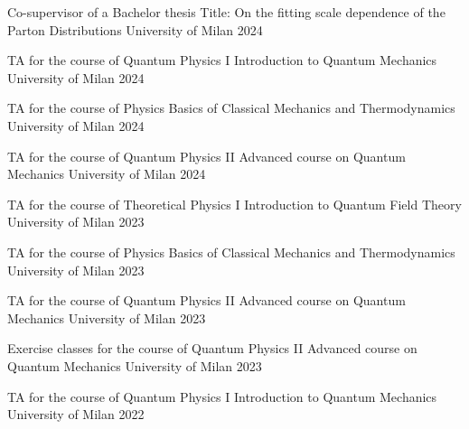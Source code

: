
\begin{cvhonors}

    \cvhonor
    {Co-supervisor of a Bachelor thesis} %
    {Title: On the fitting scale dependence of the Parton Distributions}
    {University of Milan} %
    {2024}

    \cvhonor
    {TA for the course of Quantum Physics I} %
    {Introduction to Quantum Mechanics}
    {University of Milan} %
    {2024}

    \cvhonor
    {TA for the course of Physics} %
    {Basics of Classical Mechanics and Thermodynamics}
    {University of Milan} %
    {2024}

    \cvhonor
    {TA for the course of Quantum Physics II} %
    {Advanced course on Quantum Mechanics}
    {University of Milan} %
    {2024}

    \cvhonor
    {TA for the course of Theoretical Physics I} %
    {Introduction to Quantum Field Theory}
    {University of Milan} %
    {2023}

    \cvhonor
    {TA for the course of Physics} %
    {Basics of Classical Mechanics and Thermodynamics}
    {University of Milan} %
    {2023}

    \cvhonor
    {TA for the course of Quantum Physics II} %
    {Advanced course on Quantum Mechanics}
    {University of Milan} %
    {2023}

    \cvhonor
    {Exercise classes for the course of Quantum Physics II} %
    {Advanced course on Quantum Mechanics}
    {University of Milan} %
    {2023}

    \cvhonor
    {TA for the course of Quantum Physics I} %
    {Introduction to Quantum Mechanics}
    {University of Milan} %
    {2022}

\end{cvhonors}